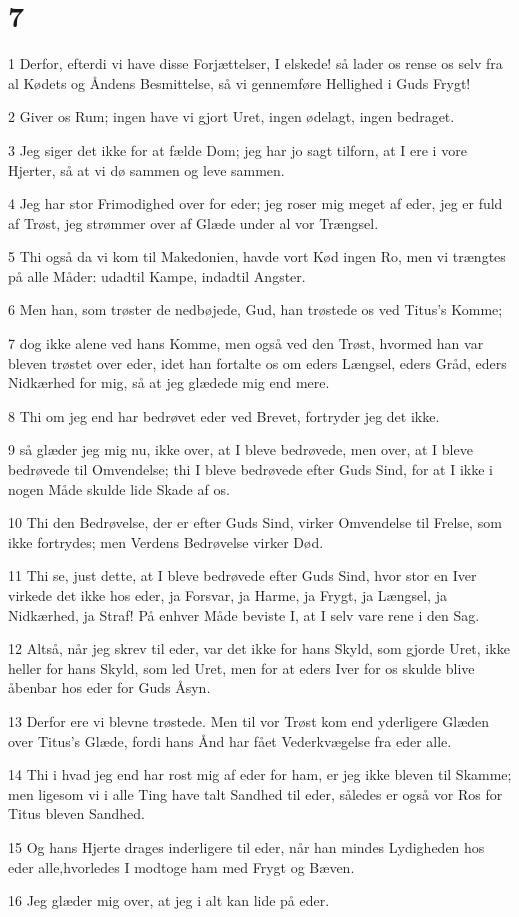 \chapter{7}

\par 1 Derfor, efterdi vi have disse Forjættelser, I elskede! så lader os rense os selv fra al Kødets og Åndens Besmittelse, så vi gennemføre Hellighed i Guds Frygt!
\par 2 Giver os Rum; ingen have vi gjort Uret, ingen ødelagt, ingen bedraget.
\par 3 Jeg siger det ikke for at fælde Dom; jeg har jo sagt tilforn, at I ere i vore Hjerter, så at vi dø sammen og leve sammen.
\par 4 Jeg har stor Frimodighed over for eder; jeg roser mig meget af eder, jeg er fuld af Trøst, jeg strømmer over af Glæde under al vor Trængsel.
\par 5 Thi også da vi kom til Makedonien, havde vort Kød ingen Ro, men vi trængtes på alle Måder: udadtil Kampe, indadtil Angster.
\par 6 Men han, som trøster de nedbøjede, Gud, han trøstede os ved Titus's Komme;
\par 7 dog ikke alene ved hans Komme, men også ved den Trøst, hvormed han var bleven trøstet over eder, idet han fortalte os om eders Længsel, eders Gråd, eders Nidkærhed for mig, så at jeg glædede mig end mere.
\par 8 Thi om jeg end har bedrøvet eder ved Brevet, fortryder jeg det ikke.
\par 9 så glæder jeg mig nu, ikke over, at I bleve bedrøvede, men over, at I bleve bedrøvede til Omvendelse; thi I bleve bedrøvede efter Guds Sind, for at I ikke i nogen Måde skulde lide Skade af os.
\par 10 Thi den Bedrøvelse, der er efter Guds Sind, virker Omvendelse til Frelse, som ikke fortrydes; men Verdens Bedrøvelse virker Død.
\par 11 Thi se, just dette, at I bleve bedrøvede efter Guds Sind, hvor stor en Iver virkede det ikke hos eder, ja Forsvar, ja Harme, ja Frygt, ja Længsel, ja Nidkærhed, ja Straf! På enhver Måde beviste I, at I selv vare rene i den Sag.
\par 12 Altså, når jeg skrev til eder, var det ikke for hans Skyld, som gjorde Uret, ikke heller for hans Skyld, som led Uret, men for at eders Iver for os skulde blive åbenbar hos eder for Guds Åsyn.
\par 13 Derfor ere vi blevne trøstede. Men til vor Trøst kom end yderligere Glæden over Titus's Glæde, fordi hans Ånd har fået Vederkvægelse fra eder alle.
\par 14 Thi i hvad jeg end har rost mig af eder for ham, er jeg ikke bleven til Skamme; men ligesom vi i alle Ting have talt Sandhed til eder, således er også vor Ros for Titus bleven Sandhed.
\par 15 Og hans Hjerte drages inderligere til eder, når han mindes Lydigheden hos eder alle,hvorledes I modtoge ham med Frygt og Bæven.
\par 16 Jeg glæder mig over, at jeg i alt kan lide på eder.

